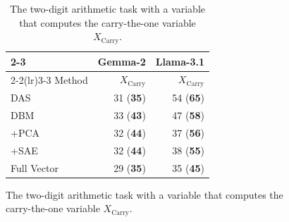 \documentclass{article}
\theoremstyle{plain}
\theoremstyle{definition}
\theoremstyle{remark}
\newcommand{\carry}{X_{\text{Carry}}}
\begin{document}
\begin{table}[t]
\begin{subfigure}[b]{0.45\textwidth}
\begin{tabular}{lrr}
    \cmidrule(lr){2-3}
 & \multicolumn{1}{c}{Gemma-2} & \multicolumn{1}{c}{Llama-3.1} \\
    \cmidrule(lr){2-2}\cmidrule(lr){3-3}
    Method & $\carry$ & $\carry$ \\
   \midrule
    DAS & 31 (\textbf{35}) & 54 (\textbf{65}) \\
    DBM & 33 (\textbf{43}) & 47 (\textbf{58}) \\
    +PCA & 32 (\textbf{44}) & 37 (\textbf{56}) \\
    +SAE & 32 (\textbf{44}) & 38 (\textbf{55}) \\
    Full Vector & 29 (\textbf{35}) & 35 (\textbf{45}) \\
    \bottomrule
  \end{tabular}
  \caption{The two-digit arithmetic task with a variable that computes the carry-the-one variable $\carry$. }
  \label{tab:results-arithmetic}
\end{subfigure}

\vspace{5pt}


\end{table}
\end{document}
